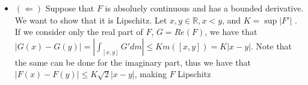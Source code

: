 \documentclass[12pt, letterpaper]{article}
\newcommand{\R}{\mathbb{R}}
\begin{document}
\begin{enumerate}
\begin{itemize}
		definition of the derivative and the order limit theorem gives us
		$\lim_{h \to 0} | \frac{F(x_m + h) - F(x_m)}{h}| = |F'(x_m)| \leq L$.
		This is a contradiction since $|F'(x_m)| > L$.  Thus $F$ has a bounded 
		derivative.  
		\item $(\Leftarrow)$ Suppose that $F$ is absoluely continuous and has a 
		bounded derivative.  We want to show that it is Lipschitz.  Let $x,y \in \R,
		x < y$, and $K = \sup |F'|$ .
		If we consider
		only the real part of $F$, $G = Re(F)$, we have that $|G(x) - G(y)| = 
		|\int_{[x,y]} G' dm | \leq K m([x,y]) = K | x - y|$.  Note that the same
		can be done for the imaginary part, thus we have that $|F(x) - F(y)| \leq K\sqrt{2} |x-y|$, making $F$ Lipschitz
	\end{itemize}
\end{enumerate}
\end{document}
